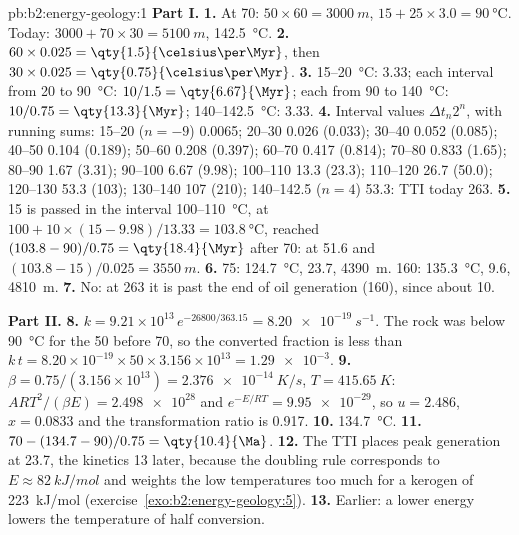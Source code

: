\begin{solution}{pb:b2:energy-geology:1}
\noindent\textbf{Part I.}
\textbf{1.} At \qty{70}{\Ma}: $50 \times 60 = \qty{3000}{m}$, $15 + 25 \times 3.0 =
\qty{90}{\celsius}$. Today: $3000 + 70 \times 30 = \qty{5100}{m}$, \qty{142.5}{\celsius}.
\textbf{2.} $60 \times 0.025 = \qty{1.5}{\celsius\per\Myr}$, then $30 \times 0.025 =
\qty{0.75}{\celsius\per\Myr}$.
\textbf{3.} 15--\qty{20}{\celsius}: \qty{3.33}{\Myr}; each interval from 20 to \qty{90}{\celsius}:
$10/1.5 = \qty{6.67}{\Myr}$; each from 90 to \qty{140}{\celsius}: $10/0.75 = \qty{13.3}{\Myr}$;
140--\qty{142.5}{\celsius}: \qty{3.33}{\Myr}.
\textbf{4.} Interval values $\Delta t_n 2^n$, with running sums: 15--20 ($n = -9$) 0.0065; 20--30
0.026 (0.033); 30--40 0.052 (0.085); 40--50 0.104 (0.189); 50--60 0.208 (0.397); 60--70 0.417
(0.814); 70--80 0.833 (1.65); 80--90 1.67 (3.31); 90--100 6.67 (9.98); 100--110 13.3 (23.3);
110--120 26.7 (50.0); 120--130 53.3 (103); 130--140 107 (210); 140--142.5 ($n = 4$) 53.3: TTI
today 263.
\textbf{5.} 15 is passed in the interval 100--\qty{110}{\celsius}, at $100 + 10 \times
(15 - 9.98)/13.33 = \qty{103.8}{\celsius}$, reached $(103.8 - 90)/0.75 = \qty{18.4}{\Myr}$ after
\qty{70}{\Ma}: at \qty{51.6}{\Ma} and $(103.8 - 15)/0.025 = \qty{3550}{m}$.
\textbf{6.} 75: \qty{124.7}{\celsius}, \qty{23.7}{\Ma}, \qty{4390}{m}. 160: \qty{135.3}{\celsius},
\qty{9.6}{\Ma}, \qty{4810}{m}.
\textbf{7.} No: at 263 it is past the end of oil generation (160), since about \qty{10}{\Ma}.

\noindent\textbf{Part II.}
\textbf{8.} $k = 9.21 \times 10^{13}\,e^{-26800/363.15} = \qty{8.20e-19}{s^{-1}}$. The rock was
below \qty{90}{\celsius} for the \qty{50}{\Myr} before \qty{70}{\Ma}, so the converted fraction is
less than $k\,t = 8.20 \times 10^{-19} \times 50 \times 3.156 \times 10^{13} = \num{1.29e-3}$.
\textbf{9.} $\beta = 0.75/(3.156 \times 10^{13}) = \qty{2.376e-14}{K/s}$, $T = \qty{415.65}{K}$:
$ART^2/(\beta E) = \num{2.498e28}$ and $e^{-E/RT} = \num{9.95e-29}$, so $u = 2.486$, $x = 0.0833$ and
the transformation ratio is 0.917.
\textbf{10.} \qty{134.7}{\celsius}.
\textbf{11.} $70 - (134.7 - 90)/0.75 = \qty{10.4}{\Ma}$.
\textbf{12.} The TTI places peak generation at \qty{23.7}{\Ma}, the kinetics \qty{13}{\Myr} later,
because the doubling rule corresponds to $E \approx \qty{82}{kJ/mol}$ and weights the low
temperatures too much for a kerogen of \qty{223}{kJ/mol} (exercise~\ref{exo:b2:energy-geology:5}).
\textbf{13.} Earlier: a lower energy lowers the temperature of half conversion.


\end{solution}
